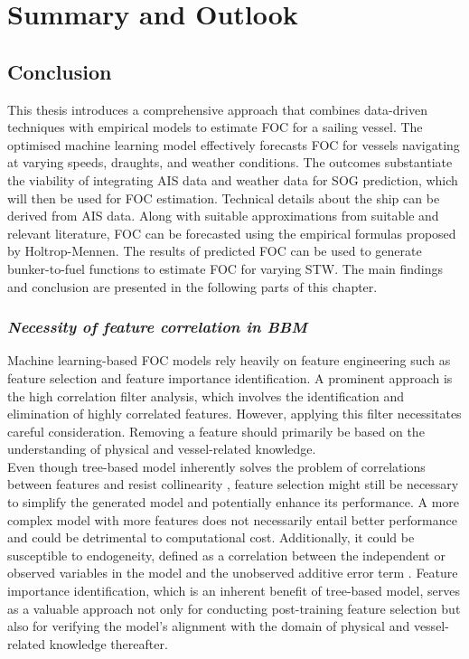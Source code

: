 \chapter{Summary and Outlook} \label{chp:outlook}

\section{Conclusion}\label{sec:conclusion}

This thesis introduces a comprehensive approach that combines data-driven techniques with empirical models to estimate FOC for a sailing vessel. The optimised machine learning model effectively forecasts FOC for vessels navigating at varying speeds, draughts, and weather conditions. The outcomes substantiate the viability of integrating AIS data and weather data for SOG prediction, which will then be used for FOC estimation. Technical details about the ship can be derived from AIS data. Along with suitable approximations from suitable and relevant literature, FOC can be forecasted using the empirical formulas proposed by Holtrop-Mennen. The results of predicted FOC can be used to generate bunker-to-fuel functions to estimate FOC for varying STW. The main findings and conclusion are presented in the following parts of this chapter.\\

\subsection*{\emph{Necessity of feature correlation in BBM}}

Machine learning-based FOC models rely heavily on feature engineering such as feature selection and feature importance identification. A prominent approach is the high correlation filter analysis, which involves the identification and elimination of highly correlated features. However, applying this filter necessitates careful consideration. Removing a feature should primarily be based on the understanding of physical and vessel-related knowledge.\\

Even though tree-based model inherently solves the problem of correlations between features and resist collinearity , feature selection might still be necessary to simplify the generated model and potentially enhance its performance. A more complex model with more features does not necessarily entail better performance and could be detrimental to computational cost. Additionally, it could be susceptible to endogeneity, defined as a correlation between the independent or observed variables in the model and the unobserved additive error term . Feature importance identification, which is an inherent benefit of tree-based model, serves as a valuable approach not only for conducting post-training feature selection but also for verifying the model's alignment with the domain of physical and vessel-related knowledge thereafter.\\ 

